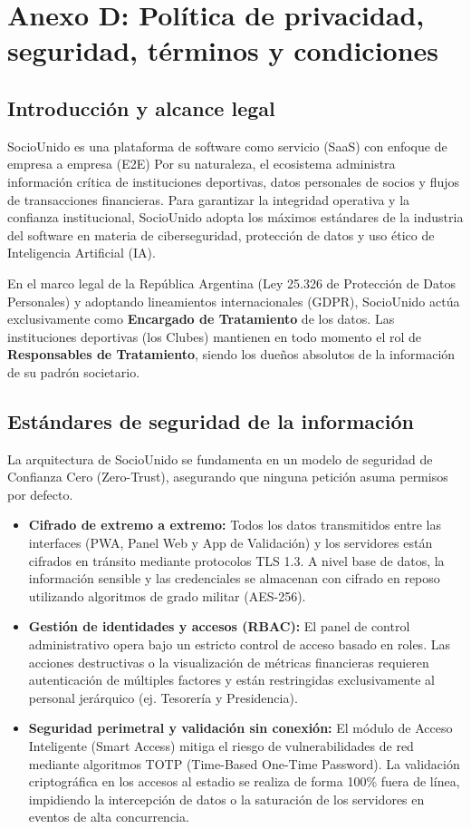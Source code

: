 \section{Anexo D: Política de privacidad, seguridad, términos y condiciones}

\subsection{Introducción y alcance legal}
SocioUnido es una plataforma de software como servicio (SaaS) con enfoque de empresa a empresa (E2E) Por su naturaleza, el ecosistema administra información crítica de instituciones deportivas, datos personales de socios y flujos de transacciones financieras. Para garantizar la integridad operativa y la confianza institucional, SocioUnido adopta los máximos estándares de la industria del software en materia de ciberseguridad, protección de datos y uso ético de Inteligencia Artificial (IA).

En el marco legal de la República Argentina (Ley 25.326 de Protección de Datos Personales) y adoptando lineamientos internacionales (GDPR), SocioUnido actúa exclusivamente como \textbf{Encargado de Tratamiento} de los datos. Las instituciones deportivas (los Clubes) mantienen en todo momento el rol de \textbf{Responsables de Tratamiento}, siendo los dueños absolutos de la información de su padrón societario.

\subsection{Estándares de seguridad de la información}
La arquitectura de SocioUnido se fundamenta en un modelo de seguridad de Confianza Cero (Zero-Trust), asegurando que ninguna petición asuma permisos por defecto.

\begin{itemize}
    \item \textbf{Cifrado de extremo a extremo:} Todos los datos transmitidos entre las interfaces (PWA, Panel Web y App de Validación) y los servidores están cifrados en tránsito mediante protocolos TLS 1.3. A nivel base de datos, la información sensible y las credenciales se almacenan con cifrado en reposo utilizando algoritmos de grado militar (AES-256).
    \item \textbf{Gestión de identidades y accesos (RBAC):} El panel de control administrativo opera bajo un estricto control de acceso basado en roles. Las acciones destructivas o la visualización de métricas financieras requieren autenticación de múltiples factores y están restringidas exclusivamente al personal jerárquico (ej. Tesorería y Presidencia).
    \item \textbf{Seguridad perimetral y validación sin conexión:} El módulo de Acceso Inteligente (Smart Access) mitiga el riesgo de vulnerabilidades de red mediante algoritmos TOTP (Time-Based One-Time Password). La validación criptográfica en los accesos al estadio se realiza de forma 100\% fuera de línea, impidiendo la intercepción de datos o la saturación de los servidores en eventos de alta concurrencia.
\end{itemize}

